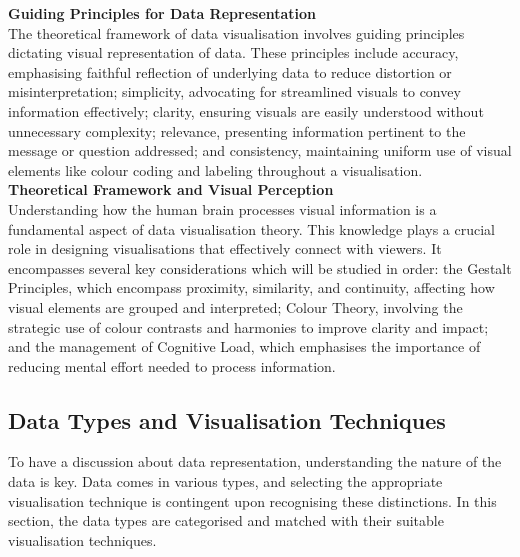 \documentclass{article}\usepackage[]{graphicx}\usepackage[]{xcolor}
\numberwithin{equation}{section}
\begin{document}
\noindent \textbf{Guiding Principles for Data Representation}\\
The theoretical framework of data visualisation involves guiding principles dictating visual representation of data. These principles include accuracy, emphasising faithful reflection of underlying data to reduce distortion or misinterpretation; simplicity, advocating for streamlined visuals to convey information effectively; clarity, ensuring visuals are easily understood without unnecessary complexity; relevance, presenting information pertinent to the message or question addressed; and consistency, maintaining uniform use of visual elements like colour coding and labeling throughout a visualisation.\\

\noindent \textbf{Theoretical Framework and Visual Perception}\\
Understanding how the human brain processes visual information is a fundamental aspect of data visualisation theory. This knowledge plays a crucial role in designing visualisations that effectively connect with viewers. It encompasses several key considerations which will be studied in order: the Gestalt Principles, which encompass proximity, similarity, and continuity, affecting how visual elements are grouped and interpreted; Colour Theory, involving the strategic use of colour contrasts and harmonies to improve clarity and impact; and the management of Cognitive Load, which emphasises the importance of reducing mental effort needed to process information.

\subsection{Data Types and Visualisation Techniques}
To have a discussion about data representation, understanding the nature of the data is key. Data comes in various types, and selecting the appropriate visualisation technique is contingent upon recognising these distinctions. In this section, the data types are categorised and matched with their suitable visualisation techniques.
\end{document}
